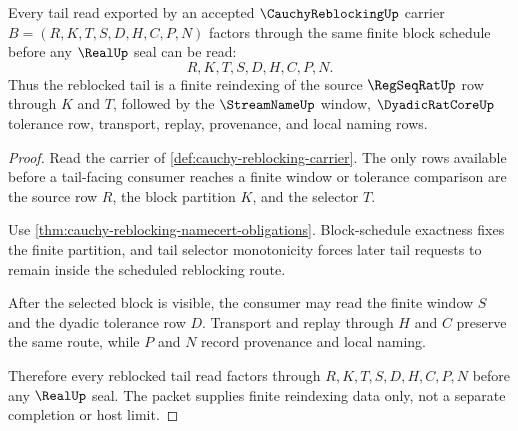 \begin{theorem}
\label{thm:cauchy-reblocking-regular-tail-selection}
Every tail read exported by an accepted $\CauchyReblockingUp$ carrier $B=(R,K,T,S,D,H,C,P,N)$ factors through the same finite block schedule before any $\RealUp$ seal can be read:
$$
R,K,T,S,D,H,C,P,N .
$$
Thus the reblocked tail is a finite reindexing of the source $\RegSeqRatUp$ row through $K$ and $T$, followed by the $\StreamNameUp$ window, $\DyadicRatCoreUp$ tolerance row, transport, replay, provenance, and local naming rows.
\end{theorem}
\begin{proof}
Read the carrier of \autoref{def:cauchy-reblocking-carrier}. The only rows available before a tail-facing consumer reaches a finite window or tolerance comparison are the source row $R$, the block partition $K$, and the selector $T$.

Use \autoref{thm:cauchy-reblocking-namecert-obligations}. Block-schedule exactness fixes the finite partition, and tail selector monotonicity forces later tail requests to remain inside the scheduled reblocking route.

After the selected block is visible, the consumer may read the finite window $S$ and the dyadic tolerance row $D$. Transport and replay through $H$ and $C$ preserve the same route, while $P$ and $N$ record provenance and local naming.

Therefore every reblocked tail read factors through $R,K,T,S,D,H,C,P,N$ before any $\RealUp$ seal. The packet supplies finite reindexing data only, not a separate completion or host limit.
\end{proof}



